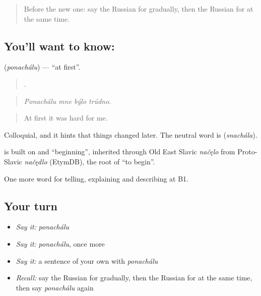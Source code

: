 \label{lesson:RU-C274-ponachalu}



\begin{quote}
Before the new one: say the Russian for gradually, then the Russian for at the same time.
\end{quote}

\subsection*{You'll want to know: }
\textbf{} (\emph{ponachálu}) — \textquotedblleft{}at first\textquotedblright{}.

\begin{quote}
   .
\end{quote}

\begin{quote}
\emph{Ponachálu mne býlo trúdno.}
\end{quote}

\begin{quote}
At first it was hard for me.
\end{quote}

Colloquial, and it hints that things changed later. The neutral word is \emph{} (\emph{snachála}).

\begin{cousinweb}
\emph{} is built on \emph{} and \emph{} \textquotedblleft{}beginning\textquotedblright{}, inherited through Old East Slavic \emph{načęlo} from Proto-Slavic \emph{načędlo} (EtymDB), the root of \emph{} \textquotedblleft{}to begin\textquotedblright{}.
\end{cousinweb}

\begin{grammarlens}[title={What you've built}]
One more word for telling, explaining and describing at B1.
\end{grammarlens}

\subsection*{Your turn}
\begin{itemize}
\raggedright
  \item \emph{Say it:} \emph{ponachálu}
  \item \emph{Say it:} \emph{ponachálu}, once more
  \item \emph{Say it:} a sentence of your own with \emph{ponachálu}
  \item \emph{Recall:} say the Russian for gradually, then the Russian for at the same time, then say \emph{ponachálu} again
\end{itemize}

